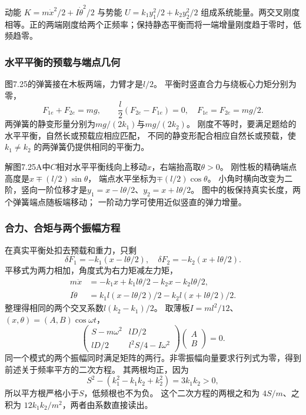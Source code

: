 \documentclass[UTF8,fontset=fandol,a4paper,11pt]{ctexart}
\begin{document}
动能 $K=m\dot x^2/2+I\dot\theta^2/2$ 与势能 $U=k_1y_1^2/2+k_2y_2^2/2$ 组成系统能量。两交叉刚度相等。正的两端刚度给两个正频率；保持静态平衡而将一端增量刚度趋于零时，低频趋零。
\subsubsection*{水平平衡的预载与端点几何}
图7.25的弹簧接在木板两端，力臂才是$l/2$。
平衡时竖直合力与绕板心力矩分别为零，
\[
F_{1e}+F_{2e}=mg,\qquad
\frac l2(F_{2e}-F_{1e})=0,
\quad F_{1e}=F_{2e}=mg/2.
\]
两弹簧的静变形量分别为$mg/(2k_1)$与$mg/(2k_2)$。
刚度不等时，要满足题给的水平平衡，自然长或预载应相应匹配，
不同的静变形配合相应自然长或预载，使 $k_1\ne k_2$ 的两弹簧仍提供相同的平衡力。

解图7.25A中$C$相对水平平衡线向上移动$x$，右端抬高取$\theta>0$。
刚性板的精确端点高度是$x\mp(l/2)\sin\theta$，
端点水平坐标为$\mp(l/2)\cos\theta$。
小角时横向改变为二阶，竖向一阶位移才是$y_1=x-l\theta/2$、$y_2=x+l\theta/2$。
图中的板保持真实长度，两个弹簧端点随板端移动；
一阶动力学可使用近似竖直的弹力增量。

\subsubsection*{合力、合矩与两个振幅方程}
在真实平衡处扣去预载和重力，只剩
\[
\delta F_1=-k_1(x-l\theta/2),\quad
\delta F_2=-k_2(x+l\theta/2).
\]
平移式为两力相加，角度式为右力矩减左力矩，
\[
\begin{aligned}
m\ddot x&=-k_1x+k_1l\theta/2-k_2x-k_2l\theta/2,\\
I\ddot\theta&=k_1l(x-l\theta/2)/2-k_2l(x+l\theta/2)/2.
\end{aligned}
\]
整理得相同的两个交叉系数$l(k_2-k_1)/2$。
取薄板$I=ml^2/12$、$(x,\theta)=(A,B)\cos\omega t$，
\[
\begin{pmatrix}
S-m\omega^2&lD/2\\
lD/2&l^2S/4-I\omega^2
\end{pmatrix}\begin{pmatrix}A\\B\end{pmatrix}=0.
\]
同一个模式的两个振幅同时满足矩阵的两行。非零振幅向量要求行列式为零，得到前述关于频率平方的二次方程。
其两根均正，因为
\[
S^2-(k_1^2-k_1k_2+k_2^2)=3k_1k_2>0,
\]
所以平方根严格小于$S$，低频根也不为负。
这个二次方程的两根之和为 $4S/m$、之积为 $12k_1k_2/m^2$，两者由系数直接读出。
\end{document}
